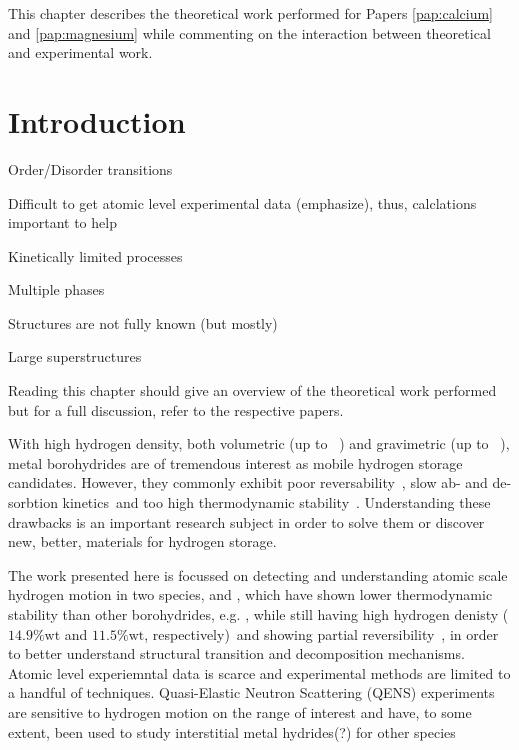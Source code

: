 This chapter describes the theoretical work performed for Papers \ref{pap:calcium} and \ref{pap:magnesium} while commenting on the interaction between theoretical and experimental work.

\section{Introduction}
\label{sec:borohydrides-introduction}


\bit
\item Order/Disorder transitions
\item Difficult to get atomic level experimental data (emphasize), thus, calclations important to help
\item Kinetically limited processes
\item Multiple phases
\item Structures are not fully known (but mostly)
\item Large superstructures
\item Reading this chapter should give an overview of the theoretical work performed but for a full discussion, refer to the respective papers.
\eit

With high hydrogen density, both volumetric (up to \missing{}~\citemiss) and gravimetric (up to \missing{}~\citemiss), metal borohydrides are of tremendous interest as mobile hydrogen storage candidates.
However, they commonly exhibit poor reversability~\citemiss, slow ab- and de-sorbtion kinetics~\citemiss and too high thermodynamic stability~\citemiss.
Understanding these drawbacks is an important research subject in order to solve them or discover new, better, materials for hydrogen storage.

The work presented here is focussed on detecting and understanding atomic scale hydrogen motion in two species,  and , which have shown lower thermodynamic stability than other borohydrides, e.g. , while still having high hydrogen denisty ($14.9\%\text{wt}$ and $11.5\%\text{wt}$, respectively)~\citemiss and showing partial reversibility~\citemiss, in order to better understand structural transition and decomposition mechanisms.
Atomic level experiemntal data is scarce and experimental methods are limited to a handful of techniques.
Quasi-Elastic Neutron Scattering (QENS) experiments are sensitive to hydrogen motion on the range of interest and have, to some extent, been used to study interstitial metal hydrides(?) for other species

